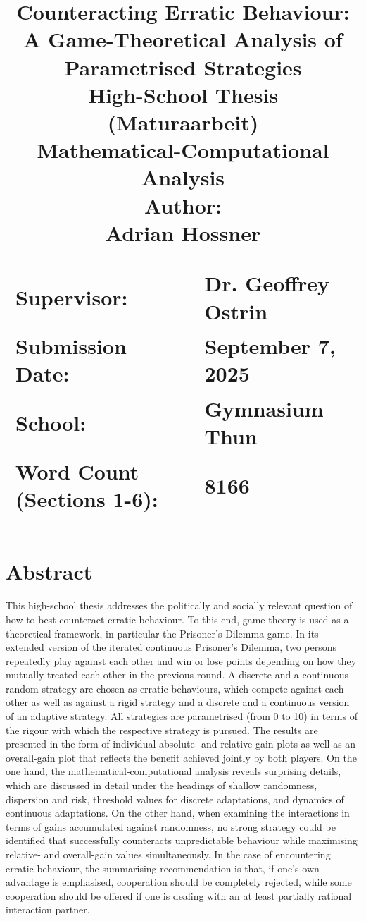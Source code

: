 \documentclass[11pt]{article}
\title{
	\textbf{Counteracting Erratic Behaviour:}\\
	\textbf{A Game-Theoretical Analysis of Parametrised Strategies}\\[\dvdist ex]
	\Large{High-School Thesis}\\
	\Large{(Maturaarbeit)}\\[\vdist ex]
	\Large{Mathematical-Computational}\\
	\Large{Analysis}\\[\vdist ex]
	\Large{Author:}\\
	\Large{Adrian Hossner}\\[3\vdist ex]
	\begin{flushleft}
		\begin{tabular}{>{\raggedright\arraybackslash}p{6cm} >{\raggedright\arraybackslash}p{5cm}}
			\Large{Supervisor: } & \Large{Dr. Geoffrey Ostrin}\\[\vdist ex]
			\Large{Submission Date: } & \Large{September 7, 2025}\\[\vdist ex]
			\Large{School: } & \Large{Gymnasium Thun}\\[\vdist ex]
			\Large{Word Count (Sections 1-6): } & \Large{8166}\\[\vdist ex]
		\end{tabular}
	\end{flushleft}
}
\date{ } %
\newcommand\emptypage{
    \null
    \thispagestyle{empty}
    \addtocounter{page}{-1}
    \newpage
    }
\begin{document}
\sloppy

\maketitle
{}

\newpage

\emptypage


\section*{Abstract}
This high-school thesis addresses the politically and socially relevant question of how to best counteract erratic behaviour.
To this end, game theory is used as a theoretical framework, in particular the Prisoner's Dilemma game.
In its extended version of the iterated continuous Prisoner's Dilemma, two persons repeatedly play against each other and win or lose points depending on how they mutually treated each other in the previous round.
A discrete and a continuous random strategy are chosen as erratic behaviours, which compete against each other as well as against a rigid strategy and a discrete and a continuous version of an adaptive strategy.
All strategies are parametrised (from 0 to 10) in terms of the rigour with which the respective strategy is pursued.
The results are presented in the form of individual absolute- and relative-gain plots as well as an overall-gain plot that reflects the benefit achieved jointly by both players.
On the one hand, the mathematical-computational analysis reveals surprising details, which are discussed in detail under the headings of shallow randomness, dispersion and risk, threshold values for discrete adaptations, and dynamics of continuous adaptations.
On the other hand, when examining the interactions in terms of gains accumulated against randomness, no strong strategy could be identified that successfully counteracts unpredictable behaviour while maximising relative- and overall-gain values simultaneously.
In the case of encountering erratic behaviour, the summarising recommendation is that, if one's own advantage is emphasised, cooperation should be completely rejected, while some cooperation should be offered if one is dealing with an at least partially rational interaction partner.

\newpage
\end{document}
